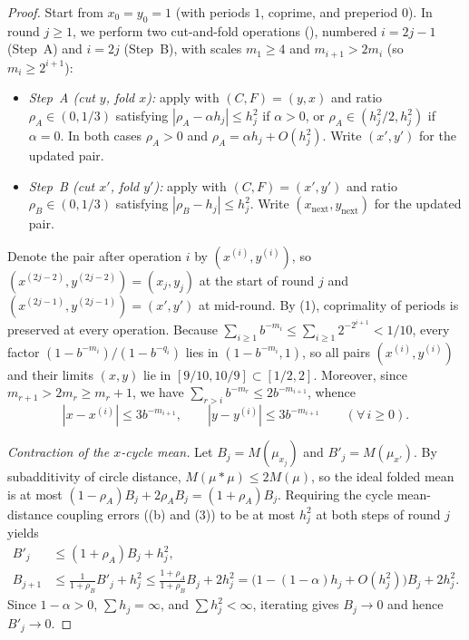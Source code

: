 \documentclass[11pt]{article}
\begin{document}
\begin{proof}
Start from $x_0=y_0=1$ (with periods $1$, coprime, and preperiod $0$). In round $j\ge1$, we perform two cut-and-fold operations (), numbered $i=2j-1$ (Step~A) and $i=2j$ (Step~B), with scales $m_1\ge4$ and $m_{i+1}>2m_i$ (so $m_i\ge 2^{i+1}$):
\begin{itemize}[nosep]
\item \emph{Step~A (cut $y$, fold $x$):} apply  with $(C,F)=(y,x)$ and ratio $\rho_A\in(0,1/3)$ satisfying $|\rho_A-\alpha h_j|\le h_j^2$ if $\alpha>0$, or $\rho_A\in(h_j^2/2,h_j^2)$ if $\alpha=0$. In both cases $\rho_A>0$ and $\rho_A=\alpha h_j+O(h_j^2)$. Write $(x',y')$ for the updated pair.
\item \emph{Step~B (cut $x'$, fold $y'$):} apply  with $(C,F)=(x',y')$ and ratio $\rho_B\in(0,1/3)$ satisfying $|\rho_B-h_j|\le h_j^2$. Write $(x_{\mathrm{next}},y_{\mathrm{next}})$ for the updated pair.
\end{itemize}
Denote the pair after operation $i$ by $(x^{(i)},y^{(i)})$, so $(x^{(2j-2)},y^{(2j-2)})=(x_j,y_j)$ at the start of round $j$ and $(x^{(2j-1)},y^{(2j-1)})=(x',y')$ at mid-round. By (1), coprimality of periods is preserved at every operation. Because $\sum_{i\ge1}b^{-m_i}\le\sum_{i\ge1}2^{-2^{i+1}}<1/10$, every factor $(1-b^{-m_i})/(1-b^{-q_i})$ lies in $(1-b^{-m_i},1)$, so all pairs $(x^{(i)},y^{(i)})$ and their limits $(x,y)$ lie in $[9/10,10/9]\subset[1/2,2]$. Moreover, since $m_{r+1}>2m_r\ge m_r+1$, we have $\sum_{r>i}b^{-m_r}\le 2b^{-m_{i+1}}$, whence
\begin{equation}\label{eq:tail-modulus}
|x-x^{(i)}|\le 3b^{-m_{i+1}},\qquad |y-y^{(i)}|\le 3b^{-m_{i+1}}\qquad(\forall\,i\ge0).
\end{equation}

\emph{Contraction of the $x$-cycle mean.} Let $B_j=M(\mu_{x_j})$ and $B'_j=M(\mu_{x'})$. By subadditivity of circle distance, $M(\mu*\mu)\le 2M(\mu)$, so the ideal folded mean is at most $(1-\rho_A)B_j+2\rho_A B_j=(1+\rho_A)B_j$. Requiring the cycle mean-distance coupling errors ((b) and (3)) to be at most $h_j^2$ at both steps of round $j$ yields
\begin{align*}
B'_j&\le (1+\rho_A)B_j+h_j^2,\\
B_{j+1}&\le\frac{1}{1+\rho_B}B'_j+h_j^2
\le\frac{1+\rho_A}{1+\rho_B}B_j+2h_j^2
=\bigl(1-(1-\alpha)h_j+O(h_j^2)\bigr)B_j+2h_j^2.
\end{align*}
Since $1-\alpha>0$, $\sum h_j=\infty$, and $\sum h_j^2<\infty$, iterating gives $B_j\to0$ and hence $B'_j\to0$.


\end{proof}
\end{document}
